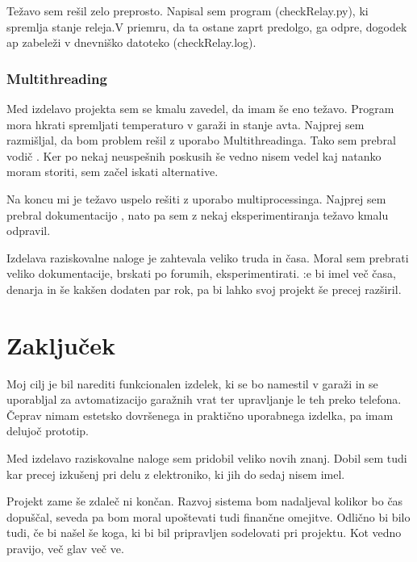 \documentclass[11pt]{article}
\begin{document}
Težavo sem rešil zelo preprosto. Napisal sem program (checkRelay.py), ki spremlja stanje releja.V priemru, da ta ostane zaprt predolgo, ga odpre, dogodek ap zabeleži v dnevniško datoteko (checkRelay.log).

\subsubsection{Multithreading}
Med izdelavo projekta sem se kmalu zavedel, da imam še eno težavo. Program mora hkrati spremljati temperaturo v garaži in stanje avta. Najprej sem razmišljal, da bom problem rešil z uporabo Multithreadinga. Tako sem prebral vodič \cite{tutorialspoint_MT}. Ker po nekaj neuspešnih poskusih še vedno nisem vedel kaj natanko moram storiti, sem začel iskati alternative.

Na koncu mi je težavo uspelo rešiti z uporabo multiprocessinga. Najprej sem prebral dokumentacijo \cite{python_MP}, nato pa sem z nekaj eksperimentiranja težavo kmalu odpravil.

Izdelava raziskovalne naloge je zahtevala veliko truda in časa. Moral sem prebrati veliko dokumentacije, brskati po forumih, eksperimentirati. :e bi imel več časa, denarja in še kakšen dodaten par rok, pa bi lahko svoj projekt še precej razširil.
\newpage
\section{Zaključek}
Moj cilj je bil narediti funkcionalen izdelek, ki se bo namestil v garaži in se uporabljal za avtomatizacijo garažnih vrat ter upravljanje le teh preko telefona. Čeprav nimam estetsko dovršenega in praktično uporabnega izdelka, pa imam delujoč prototip.

Med izdelavo raziskovalne naloge sem pridobil veliko novih znanj. Dobil sem tudi kar precej izkušenj pri delu z elektroniko, ki jih do sedaj nisem imel.

Projekt zame še zdaleč ni končan. Razvoj sistema bom nadaljeval kolikor bo čas dopuščal, seveda pa bom moral upoštevati tudi finančne omejitve. Odlično bi bilo tudi, če bi našel še koga, ki bi bil pripravljen sodelovati pri projektu. Kot vedno pravijo, več glav več ve.
\newpage
\clearpage


\end{document}
